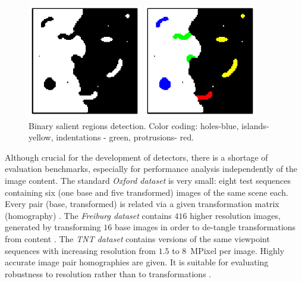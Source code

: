 \documentclass{article}
\begin{document}
\begin{figure}[htb]
\vspace{-0.5cm}
\begin{minipage}[b]{.49\linewidth}
  \centering
  \centerline{\includegraphics[width=5cm]{./Figs/binary_marks}}

\end{minipage}
\begin{minipage}[b]{0.49\linewidth}
  \centering
  \centerline{\includegraphics[width=5cm]{./Figs/binary_marks_clean_color_coded}}

\end{minipage}
\vspace{-0.5cm}
\caption{Binary salient regions detection.
Color coding: holes-blue, islands- yellow,
indentations - green, protrusions- red. }
\label{fig:binary_sal}
\end{figure}

Although crucial for the development of detectors, there is a shortage of evaluation benchmarks, especially for performance analysis independently of the image content. The standard {\em Oxford dataset} is very small: eight test sequences containing six (one base and five transformed) images of the same scene each. Every pair (base, transformed) is related via a given transformation matrix (homography) \cite{Mikolajczyk:2005}.  The {\em Freiburg dataset} contains $416$ higher resolution images, generated by transforming $16$ base images in order to de-tangle transformations from content \cite{FischerDB14}.  
The {\em TNT dataset} contains versions of the same viewpoint sequences with increasing resolution from $1.5$ to $8$~MPixel per image. Highly accurate image pair homographies are given. It is suitable for evaluating robustness to resolution rather than to transformations \cite{CorRos2013}. 
\end{document}
